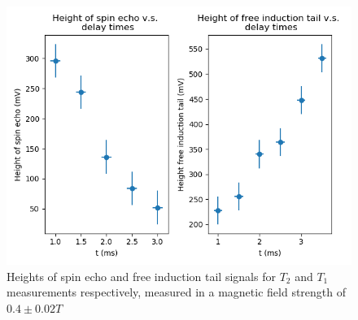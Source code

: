 \documentclass[a4paper, 12pt]{article}  %
\begin{document}
\begin{figure}[htb]
    \centering
    \includegraphics[scale=0.65]{raw_data.png}
    \caption{Heights of spin echo and free induction tail signals for $T_2$ and $T_1$ measurements respectively, measured in a magnetic field strength of $0.4 \pm 0.02 T$}
    \label{fig:raw_data}
\end{figure}
\end{document}
